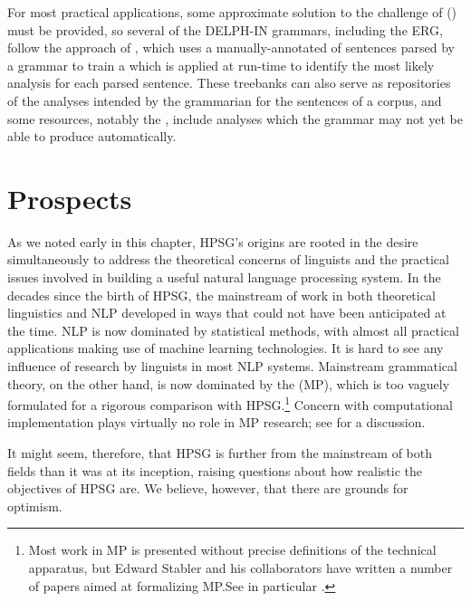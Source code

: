 \documentclass[output=paper]{langsci/langscibook}
\begin{document}
For most practical applications, some approximate solution to the challenge of  () must be provided, so several of the DELPH-IN grammars, including the ERG, follow the approach of \citet*{OFTM2004a-u-platte}, which uses a manually-annotated  of sentences parsed by a grammar to train a  which is applied at run-time to identify the most likely analysis for each parsed sentence.  These treebanks can also serve as repositories of the analyses intended by the grammarian for the sentences of a corpus, and some resources, notably the  \citep*{BvNM2001a-u}, include analyses which the grammar may not yet be able to produce automatically.  

\section{Prospects}

As we noted early in this chapter, HPSG's origins are rooted in the desire simultaneously to address the theoretical concerns of linguists and the practical issues involved in building a useful natural language processing system.  In the decades since the birth of HPSG, the mainstream of work in both theoretical linguistics and NLP developed in ways that could not have been anticipated at the time.  NLP is now dominated by statistical methods, with almost all practical applications making use of machine learning technologies.  It is hard to see any influence of research by linguists in most NLP systems.  Mainstream grammatical theory, on the other hand, is now dominated by the  (MP), which is too vaguely formulated for a rigorous comparison with HPSG.\footnote{Most work in MP is presented without precise definitions of the technical apparatus, but Edward Stabler and his collaborators have written a number of papers aimed at formalizing MP.See in particular \citet{CollStab2016}.}   Concern with computational implementation plays virtually no role in MP research; see \citet{MuellerGT-Eng1} for a discussion.

It might seem, therefore, that HPSG is further from the mainstream of both fields than it was at its inception, raising questions about how realistic the objectives of HPSG are.  We believe, however, that there are grounds for optimism.
\end{document}

